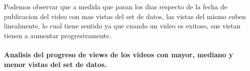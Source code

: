             \begin{figure}[ht]
            \end{figure}
        \FloatBarrier
        Podemos observar que a medida que pasan los dias respecto de la fecha de
        publicacion del video con mas vistas del set de datos, las vistas del
        mismo suben linealmente, lo cual tiene sentido ya que cuando un video
        es exitoso, sus vistan tienen a aumentar progresivamente.
        \newpage

        \paragraph{Analisis del progreso de views de los videos con mayor, mediano y menor vistas del set de datos.}

